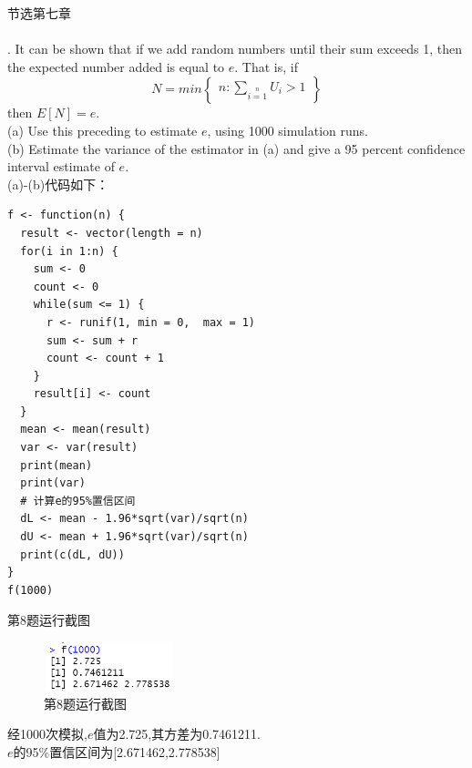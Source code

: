 \documentclass{book}
\begin{document}
\centering
节选第七章 \\

\hspace*{\fill} \\
\justifying
{}. It can be shown that if we add random numbers until their sum exceeds 1, then the expected
number added is equal to $e$. That is, if
\begin{equation}
    N = min\left\{
    \begin{aligned}
        n:\sum\limits_{i=1}\limits^{n}U_{i} > 1
    \end{aligned}
    \right\}
\end{equation}
\noindent
then $E[N] = e$. \\
(a) Use this preceding to estimate $e$, using 1000 simulation runs. \\
(b) Estimate the variance of the estimator in (a) and give a 95 percent confidence interval estimate of $e$. \\
(a)-(b)代码如下：
\lstset{language = R}
\begin{lstlisting}
f <- function(n) {
  result <- vector(length = n) 
  for(i in 1:n) {
    sum <- 0
    count <- 0
    while(sum <= 1) {
      r <- runif(1, min = 0,  max = 1)
      sum <- sum + r
      count <- count + 1
    }
    result[i] <- count
  }
  mean <- mean(result)
  var <- var(result)
  print(mean)
  print(var)
  # 计算e的95%置信区间
  dL <- mean - 1.96*sqrt(var)/sqrt(n)
  dU <- mean + 1.96*sqrt(var)/sqrt(n)
  print(c(dL, dU))
}
f(1000)
\end{lstlisting}
第8题运行截图
\begin{figure}[H]
    \centering
    \includegraphics*[height = 1.4cm, width = 3.8cm]{gramFile/第8题运行截图.PNG}
    \caption{第8题运行截图}
\end{figure}
\noindent
经1000次模拟,$e$值为2.725,其方差为0.7461211. \\
$e$的95\%置信区间为[2.671462,2.778538]

\hspace*{\fill} \\
\end{document}
